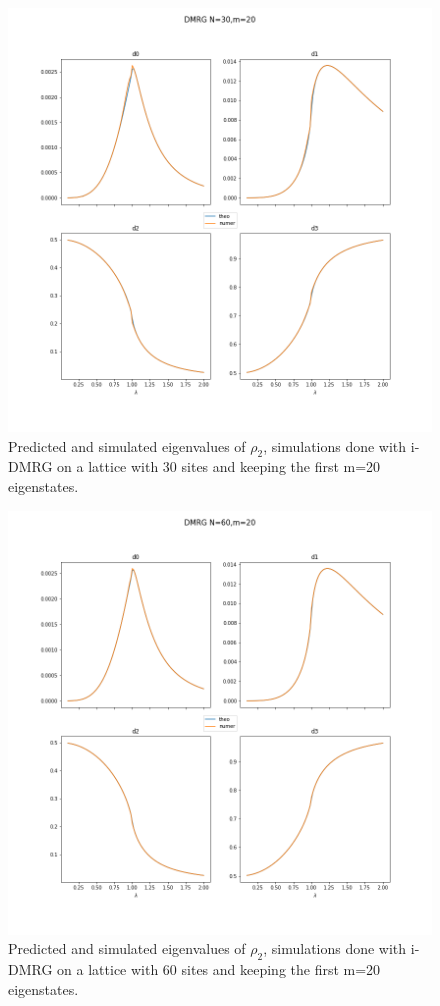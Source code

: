 \documentclass[10pt,a4paper]{article}
\begin{document}
\begin{figure}[b]
	\includegraphics[width=\linewidth]{dmrg3020}
	\caption{Predicted and simulated eigenvalues of $\rho_2$, simulations done with i-DMRG on a lattice with 30 sites and keeping the first m=20 eigenstates.}
	\label{fig:dmrg3020}
\end{figure}
\begin{figure}[b]
	\includegraphics[width=\linewidth]{dmrg6020}
	\caption{Predicted and simulated eigenvalues of $\rho_2$, simulations done with i-DMRG on a lattice with 60 sites and keeping the first m=20 eigenstates.}
	\label{fig:dmrg6020}
\end{figure}
\end{document}
